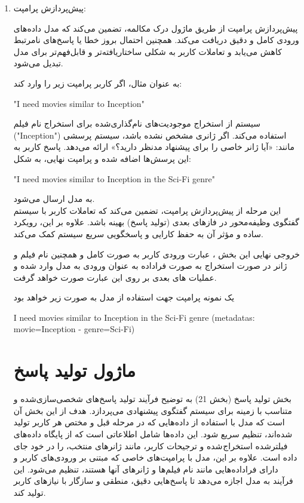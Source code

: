\begin{enumerate}
\item

پیش‌پردازش پرامپت:

پیش‌پردازش پرامپت از طریق ماژول درک مکالمه، تضمین می‌کند که مدل داده‌های ورودی کامل و دقیق دریافت می‌کند. همچنین احتمال بروز خطا یا پاسخ‌های نامرتبط کاهش می‌یابد و  تعاملات کاربر به شکلی ساختاریافته‌تر و قابل‌فهم‌تر برای مدل تبدیل می‌شود.

به عنوان مثال، اگر کاربر پرامپت زیر را وارد کند: 
\begin{displayquote}
\begin{LTR}
"I need movies similar to Inception"
\end{LTR}
\end{displayquote}

سیستم از استخراج موجودیت‌های نام‌گذاری‌شده برای استخراج نام فیلم ("Inception") استفاده می‌کند.
اگر ژانری مشخص نشده باشد، سیستم پرسشی مانند: «آیا ژانر خاصی را برای پیشنهاد مدنظر دارید؟» ارائه می‌دهد.
پاسخ کاربر به این پرسش‌ها اضافه شده و پرامپت نهایی، به شکل: 

\begin{displayquote}
\begin{LTR}
"I need movies similar to Inception in the Sci-Fi genre"
\end{LTR}
\end{displayquote}
به مدل ارسال می‌شود.
\\
این مرحله از پیش‌پردازش پرامپت، تضمین می‌کند که تعاملات کاربر با سیستم گفتگوی وظیفه‌محور در فازهای بعدی (تولید پاسخ) بهینه باشد. علاوه بر این، رویکرد ساده و مؤثر آن به حفظ کارایی و پاسخگویی سریع سیستم کمک می‌کند.

خروجی نهایی این بخش ، عبارت ورودی کاربر به صورت کامل و همچنین نام فیلم و ژانر در صورت استخراج به صورت فراداده به عنوان ورودی به مدل وارد شده و عملیات های بعدی بر روی این عبارت صورت خواهد گرفت.

یک نمونه پرامپت جهت استفاده از مدل به صورت زیر خواهد بود
\begin{displayquote}
\begin{LTR}
{I need movies similar to Inception in the Sci-Fi genre} (metadatas: movie={Inception} - genre={Sci-Fi})
\end{LTR}
\end{displayquote}


\section{ماژول تولید پاسخ}
بخش تولید پاسخ%
 (بخش 21) به توضیح فرآیند تولید پاسخ‌های شخصی‌سازی‌شده و متناسب با زمینه برای سیستم گفتگوی پیشنهادی می‌پردازد. هدف از این بخش آن است که مدل با استفاده از داده‌هایی که در مرحله قبل و مختص هر کاربر تولید شده‌اند، تنظیم سریع شود. این داده‌ها شامل اطلاعاتی است که از پایگاه داده‌های فیلترشده استخراج شده و ترجیحات کاربر، مانند ژانرهای منتخب، را در خود جای داده است. علاوه بر این، مدل با پرامپت‌های خاصی که مبتنی بر ورودی‌های کاربر و دارای فراداده‌هایی مانند نام فیلم‌ها و ژانرهای آنها هستند، تنظیم می‌شود. این فرآیند به مدل اجازه می‌دهد تا پاسخ‌هایی دقیق، منطقی و سازگار با نیازهای کاربر تولید کند. 



\end{enumerate}
